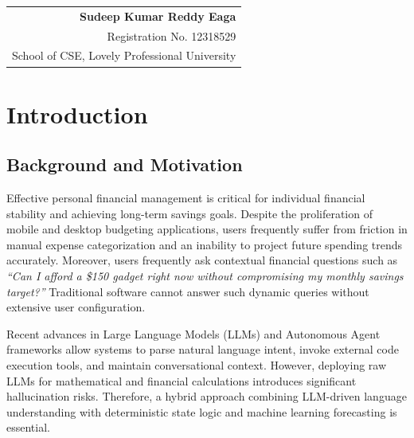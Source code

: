 \documentclass[12pt,a4paper,oneside]{report}
\newcommand*{\name}{Sudeep Kumar Reddy Eaga}
\newcommand*{\id}{12318529}
\begin{document}
\noindent \begin{tabular}{@{}r}
\textbf{\name} \\
Registration No. \id \\
School of CSE, Lovely Professional University \\
\end{tabular}

\newpage

\tableofcontents
\newpage
\listoffigures
\newpage
\listoftables
\newpage


\chapter{Introduction}
\label{chap:intro}

\section{Background and Motivation}
Effective personal financial management is critical for individual financial stability and achieving long-term savings goals. Despite the proliferation of mobile and desktop budgeting applications, users frequently suffer from friction in manual expense categorization and an inability to project future spending trends accurately. Moreover, users frequently ask contextual financial questions such as \textit{``Can I afford a \$150 gadget right now without compromising my monthly savings target?''} Traditional software cannot answer such dynamic queries without extensive user configuration.

Recent advances in Large Language Models (LLMs) and Autonomous Agent frameworks allow systems to parse natural language intent, invoke external code execution tools, and maintain conversational context. However, deploying raw LLMs for mathematical and financial calculations introduces significant hallucination risks. Therefore, a hybrid approach combining LLM-driven language understanding with deterministic state logic and machine learning forecasting is essential.
\end{document}
